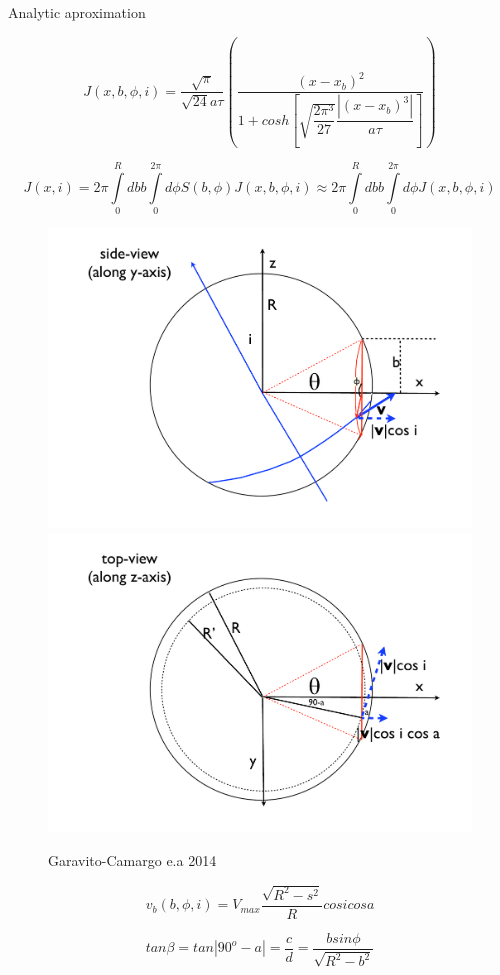 \documentclass{beamer}
\begin{document}
\begin{frame}{Analytic aproximation}

\begin{equation}
J(x, b, \phi, i) = \dfrac{\sqrt{\pi}}{\sqrt{24}a\tau}\left( \dfrac{(x - x_b)^2}{1 + cosh[\sqrt{\dfrac{2\pi^3}{27}}\dfrac{|(x-x_b)^3|}{a\tau}]} \right ) 
\end{equation}


\begin{equation}
J(x, i) = 2\pi \int \limits_0^R db b \int \limits_0^{2\pi}d\phi S(b,\phi)J(x, b, \phi, i) \approx 2\pi \int \limits_0^R db b \int \limits_0^{2\pi}d\phi J(x, b, \phi, i)
\end{equation}
\end{frame}

\begin{frame}
\begin{figure}
\includegraphics[scale=0.2]{Figures/fig11a.pdf}
\includegraphics[scale=0.2]{Figures/fig11b.pdf}
\caption*{Garavito-Camargo e.a 2014}
\end{figure}

\begin{equation}
v_b(b, \phi, i) =   V_{max}\dfrac{\sqrt{R^2 - s^2}}{R}cosi cosa
\end{equation}

\begin{equation}
tan \beta = tan|90^o-a| = \dfrac{c}{d} = \dfrac{b sin \phi}{\sqrt{R^2 - b^2}}
\end{equation}
\end{frame}
\end{document}
